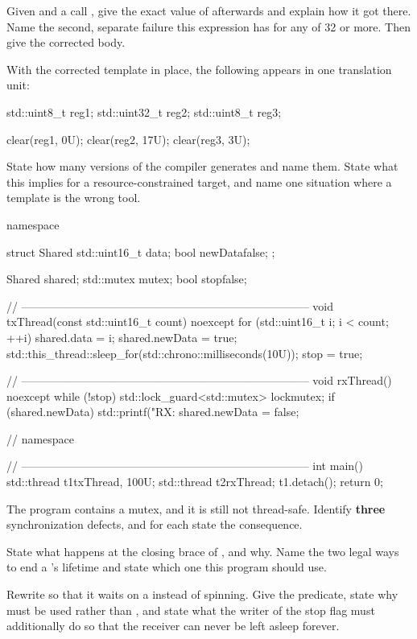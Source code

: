 \noindent Given  and a call , give
the exact value of  afterwards and explain how it got there. Name the second, separate
failure this expression has for any  of 32 or more. Then give the corrected body.

 With the corrected template in place, the following appears in one translation unit:

\begin{cppcode}
std::uint8_t reg1{};
std::uint32_t reg2{};
std::uint8_t reg3{};

clear(reg1, 0U);
clear(reg2, 17U);
clear(reg3, 3U);
\end{cppcode}

\noindent State how many versions of  the compiler generates and name them. State
what this implies for a resource-constrained target, and name one situation where a template is the
wrong tool. 

\label{exa:q:8}

\begin{cppcode}
namespace
{
struct Shared
{
    std::uint16_t data{};
    bool newData{false};
};

Shared shared{};
std::mutex mutex{};
bool stop{false};

// -----------------------------------------------------------------------------
void txThread(const std::uint16_t count) noexcept
{
    for (std::uint16_t i{}; i < count; ++i)
    {
        shared.data    = i;
        shared.newData = true;
        std::this_thread::sleep_for(std::chrono::milliseconds(10U));
    }
    stop = true;
}

// -----------------------------------------------------------------------------
void rxThread() noexcept
{
    while (!stop)
    {
        std::lock_guard<std::mutex> lock{mutex};
        if (shared.newData)
        {
            std::printf("RX: %
            shared.newData = false;
        }
    }
}
} // namespace

// -----------------------------------------------------------------------------
int main()
{
    std::thread t1{txThread, 100U};
    std::thread t2{rxThread};
    t1.detach();
    return 0;
}
\end{cppcode}

 The program contains a mutex, and it is still not thread-safe. Identify \textbf{three}
synchronization defects, and for each state the consequence. 

 State what happens at the closing brace of , and why. Name the two legal ways
to end a 's lifetime and state which one this program should use. 

 Rewrite  so that it waits on a  instead of
spinning. Give the predicate, state why  must be used rather than
, and state what the writer of the stop flag must additionally do so that the
receiver can never be left asleep forever. 
